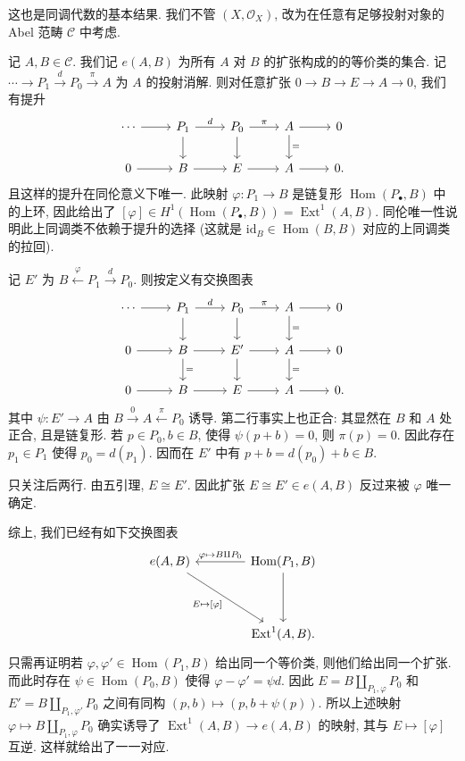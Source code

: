 \documentclass{article}
\theoremstyle{exercise}
\theoremstyle{plain}
\theoremstyle{remark}
\newenvironment{proofc}{\proof}{\endproof}
\def\id{\mathrm{id}}
\def\sO{\mathscr{O}}
\def\cC{\mathcal{C}}
\def\Hom{\operatorname{Hom}}
\def\Ext{\operatorname{Ext}}
\begin{document}
\begin{proofc}
  这也是同调代数的基本结果. 我们不管 $(X, \sO_X)$, 改为在任意有足够投射对象的 Abel 范畴 $\cC$ 中考虑.

  记 $A, B \in \cC$. 我们记 $e(A, B)$ 为所有 $A$ 对 $B$ 的扩张构成的的等价类的集合.
  记 $\cdots \to P_1 \xrightarrow{d} P_0 \xrightarrow{\pi} A$ 为 $A$ 的投射消解.
  则对任意扩张 $0 \to B \to E \to A \to 0$, 我们有提升
  \[
    \begin{tikzcd}
      \cdots \ar[r] & P_1 \ar[r, "d"] \ar[d] & P_0 \ar[r, "\pi"] \ar[d] & A \ar[r] \ar[d, "="] & 0 \\
      0      \ar[r] & B   \ar[r]             & E   \ar[r]               & A \ar[r]             & 0.
    \end{tikzcd}
  \]
  且这样的提升在同伦意义下唯一. 此映射 $\varphi \colon P_1 \to B$ 是链复形 $\Hom(P_\bullet, B)$ 中的上环,
  因此给出了 $[\varphi] \in H^1(\Hom(P_\bullet, B)) = \Ext^1(A, B)$.
  同伦唯一性说明此上同调类不依赖于提升的选择 (这就是 $\id_B \in \Hom(B, B)$ 对应的上同调类的拉回).

  记 $E'$ 为 $B \xleftarrow{\varphi} P_1 \xrightarrow{d} P_0$. 则按定义有交换图表
  \[
    \begin{tikzcd}
      \cdots \ar[r] & P_1 \ar[r, "d"] \ar[d] & P_0 \ar[r, "\pi"] \ar[d] & A \ar[r] \ar[d, "="] & 0 \\
      0      \ar[r] & B   \ar[r] \ar[d, "="] & E'  \ar[r]        \ar[d] & A \ar[r] \ar[d, "="] & 0 \\
      0      \ar[r] & B   \ar[r]             & E   \ar[r]               & A \ar[r]             & 0.
    \end{tikzcd}
  \]
  其中 $\psi \colon E' \to A$ 由 $B \xrightarrow{0} A \xleftarrow{\pi} P_0$ 诱导.
  第二行事实上也正合: 其显然在 $B$ 和 $A$ 处正合, 且是链复形.
  若 $p \in P_0, b \in B$, 使得 $\psi(p + b) = 0$, 则 $\pi(p) = 0$. 因此存在 $p_1 \in P_1$ 使得 $p_0 = d(p_1)$.
  因而在 $E'$ 中有 $p + b = d(p_0) + b \in B$.

  只关注后两行. 由五引理, $E \cong E'$. 因此扩张 $E \cong E' \in e(A, B)$ 反过来被 $\varphi$ 唯一确定.

  综上, 我们已经有如下交换图表
  \[
    \begin{tikzcd}[sep=4em]
      e(A, B) \ar[dr, "E \mapsto \lbrack\varphi\rbrack"'] & \Hom(P_1, B) \ar[l, "\varphi \mapsto B \amalg P_0"'] \ar[d] \\
       & \Ext^1(A, B).
    \end{tikzcd}
  \]
  只需再证明若 $\varphi, \varphi' \in \Hom(P_1, B)$ 给出同一个等价类, 则他们给出同一个扩张.
  而此时存在 $\psi \in \Hom(P_0, B)$ 使得 $\varphi - \varphi' = \psi d$.
  因此 $E = B \amalg_{P_1, \varphi} P_0$ 和 $E' = B \amalg_{P_1, \varphi'} P_0$ 之间有同构 $(p, b) \mapsto (p, b + \psi(p))$.
  所以上述映射 $\varphi \mapsto B \amalg_{P_1, \varphi} P_0$ 确实诱导了 $\Ext^1(A, B) \to e(A, B)$ 的映射,
  其与 $E \mapsto [\varphi]$ 互逆. 这样就给出了一一对应.
\end{proofc}
\end{document}
